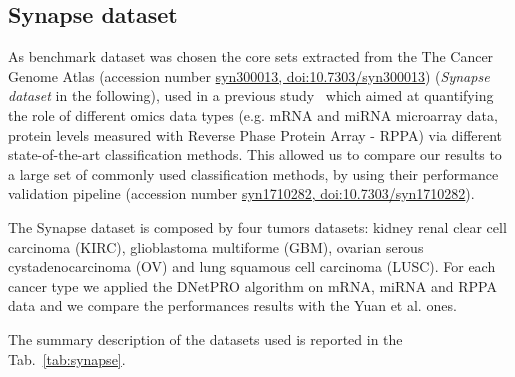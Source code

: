 \documentclass{standalone}
\begin{document}
\subsection[Synapse]{Synapse dataset}\label{synapse}

As benchmark dataset was chosen the core sets extracted from the The Cancer Genome Atlas (accession number \href{https://www.synapse.org/#!Synapse:syn300013/wiki/27406}{syn300013, doi:10.7303/syn300013}) (\emph{Synapse dataset} in the following), used in a previous study~\cite{Yuan2014} which aimed at quantifying the role of different omics data types (e.g. mRNA and miRNA microarray data,  protein levels measured with Reverse Phase Protein Array - RPPA) via different state-of-the-art classification methods.
This allowed us to compare our results to a large set of commonly used classification methods, by using their performance validation pipeline (accession number \href{https://www.synapse.org/#!Synapse:syn1710282/wiki/27303}{syn1710282, doi:10.7303/syn1710282}).

The Synapse dataset is composed by four tumors datasets: kidney renal clear cell carcinoma (KIRC), glioblastoma multiforme (GBM), ovarian serous cystadenocarcinoma (OV) and lung squamous cell carcinoma (LUSC).
For each cancer type we applied the DNetPRO algorithm on mRNA, miRNA and RPPA data and we compare the performances results with the Yuan et al. ones.

The summary description of the datasets used is reported in the Tab.~\ref{tab:synapse}.
\end{document}
